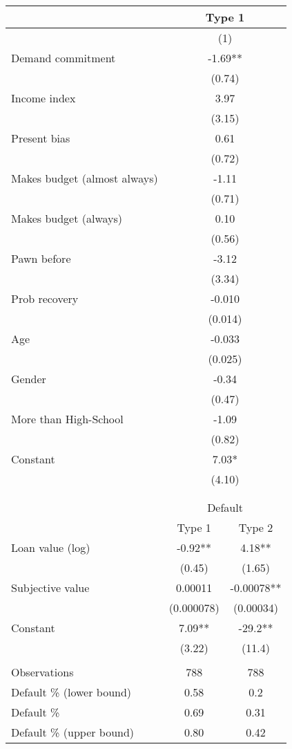 \begin{tabular}{lcc}
\toprule
      & \multicolumn{2}{c}{Type 1} \\
\midrule
      & \multicolumn{2}{c}{(1)} \\
\midrule
\midrule
Demand commitment  & \multicolumn{2}{c}{-1.69**} \\
      & \multicolumn{2}{c}{(0.74)} \\
Income index & \multicolumn{2}{c}{3.97} \\
      & \multicolumn{2}{c}{(3.15)} \\
Present bias & \multicolumn{2}{c}{0.61} \\
      & \multicolumn{2}{c}{(0.72)} \\
Makes budget (almost always) & \multicolumn{2}{c}{-1.11} \\
      & \multicolumn{2}{c}{(0.71)} \\
Makes budget (always) & \multicolumn{2}{c}{0.10} \\
      & \multicolumn{2}{c}{(0.56)} \\
Pawn before & \multicolumn{2}{c}{-3.12} \\
      & \multicolumn{2}{c}{(3.34)} \\
Prob recovery & \multicolumn{2}{c}{-0.010} \\
      & \multicolumn{2}{c}{(0.014)} \\
Age   & \multicolumn{2}{c}{-0.033} \\
      & \multicolumn{2}{c}{(0.025)} \\
Gender & \multicolumn{2}{c}{-0.34} \\
      & \multicolumn{2}{c}{(0.47)} \\
More than High-School & \multicolumn{2}{c}{-1.09} \\
      & \multicolumn{2}{c}{(0.82)} \\
Constant & \multicolumn{2}{c}{7.03*} \\
      & \multicolumn{2}{c}{(4.10)} \\
\midrule
\midrule
      &       &  \\
      &       &  \\
\midrule
      & \multicolumn{2}{c}{Default} \\
\cmidrule{2-3}      & Type 1 & Type 2 \\
\midrule
\midrule
Loan value (log) & -0.92** & 4.18** \\
      & (0.45) & (1.65) \\
Subjective value & 0.00011 & -0.00078** \\
      & (0.000078) & (0.00034) \\
Constant  & 7.09** & -29.2** \\
      & (3.22) & (11.4) \\
      &       &  \\
\midrule
Observations & 788   & 788 \\
\midrule
Default \% (lower bound) & 0.58  & 0.2 \\
Default \%  & 0.69  & 0.31 \\
Default \% (upper bound) & 0.80  & 0.42 \\
\bottomrule
\bottomrule
\end{tabular}%
